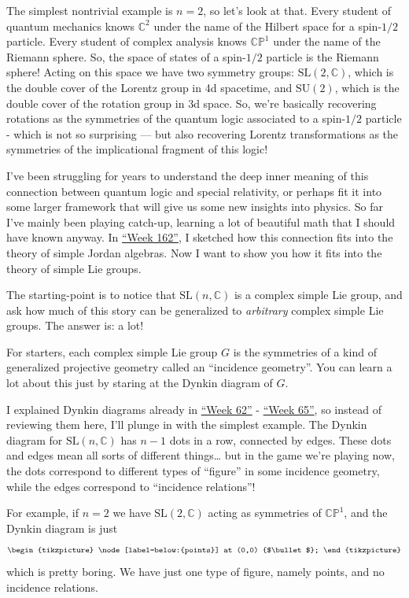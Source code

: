 \documentclass{article}
\begin{document}
The simplest nontrivial example is \(n = 2\), so let's look at that.
Every student of quantum mechanics knows \(\mathbb{C}^2\) under the name
of the Hilbert space for a spin-\(1/2\) particle. Every student of
complex analysis knows \(\mathbb{CP}^1\) under the name of the Riemann
sphere. So, the space of states of a spin-\(1/2\) particle is the
Riemann sphere! Acting on this space we have two symmetry groups:
\(\mathrm{SL}(2,\mathbb{C})\), which is the double cover of the Lorentz
group in 4d spacetime, and \(\mathrm{SU}(2)\), which is the double cover
of the rotation group in 3d space. So, we're basically recovering
rotations as the symmetries of the quantum logic associated to a
spin-\(1/2\) particle - which is not so surprising --- but also
recovering Lorentz transformations as the symmetries of the
implicational fragment of this logic!

I've been struggling for years to understand the deep inner meaning of
this connection between quantum logic and special relativity, or perhaps
fit it into some larger framework that will give us some new insights
into physics. So far I've mainly been playing catch-up, learning a lot
of beautiful math that I should have known anyway. In
\protect\hyperlink{week162}{``Week 162''}, I sketched how this
connection fits into the theory of simple Jordan algebras. Now I want to
show you how it fits into the theory of simple Lie groups.

The starting-point is to notice that \(\mathrm{SL}(n,\mathbb{C})\) is a
complex simple Lie group, and ask how much of this story can be
generalized to \emph{arbitrary} complex simple Lie groups. The answer
is: a lot!

For starters, each complex simple Lie group \(G\) is the symmetries of a
kind of generalized projective geometry called an ``incidence
geometry''. You can learn a lot about this just by staring at the Dynkin
diagram of \(G\).

I explained Dynkin diagrams already in \protect\hyperlink{week62}{``Week
62''} - \protect\hyperlink{week65}{``Week 65''}, so instead of reviewing
them here, I'll plunge in with the simplest example. The Dynkin diagram
for \(\mathrm{SL}(n,\mathbb{C})\) has \(n-1\) dots in a row, connected
by edges. These dots and edges mean all sorts of different
things\ldots{} but in the game we're playing now, the dots correspond to
different types of ``figure'' in some incidence geometry, while the
edges correspond to ``incidence relations''!

For example, if \(n = 2\) we have \(\mathrm{SL}(2,\mathbb{C})\) acting
as symmetries of \(\mathbb{CP}^1\), and the Dynkin diagram is just \[
  \begin{tikzpicture}
    \node[label=below:{points}] at (0,0) {$\bullet$};
  \end{tikzpicture}
\] which is pretty boring. We have just one type of figure, namely
points, and no incidence relations.
\end{document}
